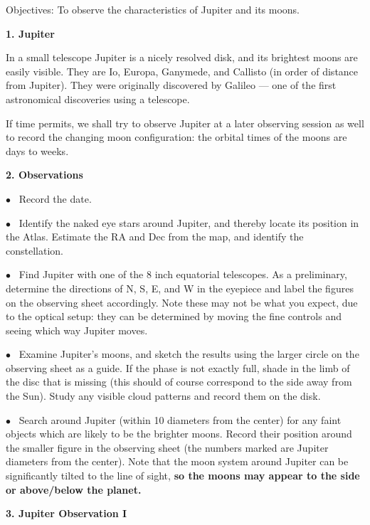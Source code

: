 
\noindent
{Objectives:} To observe the characteristics of Jupiter and its moons.

\bigskip\noindent

\bigskip
\noindent
{\bf 1. Jupiter }

\medskip
\noindent
In a small telescope Jupiter is a nicely resolved disk, and its
brightest moons are easily visible. They are Io, Europa, Ganymede, and
Callisto (in order of distance from Jupiter). They were originally
discovered by Galileo --- one of the first astronomical discoveries
using a telescope.

If time permits, we shall try to observe Jupiter at a later observing
session as well to record the changing moon configuration: the orbital
times of the moons are days to weeks.

\bigskip
\noindent
{\bf 2. Observations}

\medskip
\noindent

\noindent $\bullet$ \ 
Record the date.

\medskip
\noindent $\bullet$ \ 
 Identify the naked eye stars around Jupiter, and thereby locate its 
position in the Atlas. Estimate the RA and Dec from the map,
and identify the constellation.

\medskip
\noindent $\bullet$ \ 
Find Jupiter with one of the 8 inch equatorial
telescopes.  As a preliminary, determine the directions of N, S, E,
and W in the eyepiece and label the figures on the observing sheet
accordingly. Note these may not be what you expect, due to the optical
setup: they can be determined by moving the fine controls and seeing
which way Jupiter moves.

\medskip
\noindent $\bullet$ \ 
Examine Jupiter's moons, and sketch the results using the
larger circle on the observing sheet as a guide. If the phase is not exactly
full, shade in the limb of the disc that is missing (this should of
course correspond to the side away from the Sun). 
Study any visible cloud patterns and record them on the
disk.  

\medskip
\noindent $\bullet$ \ Search around Jupiter (within 10 diameters from
the center) for any faint objects which are likely to be the brighter
moons. Record their position around the smaller figure in the
observing sheet (the numbers marked are Jupiter diameters from the
center). Note that the moon system around Jupiter can be significantly
tilted to the line of sight, {\bf so the moons may appear to the side
  or above/below the planet.}

\newpage
\noindent
{\bf 3. Jupiter Observation I}
\bigskip\bigskip
\noindent

